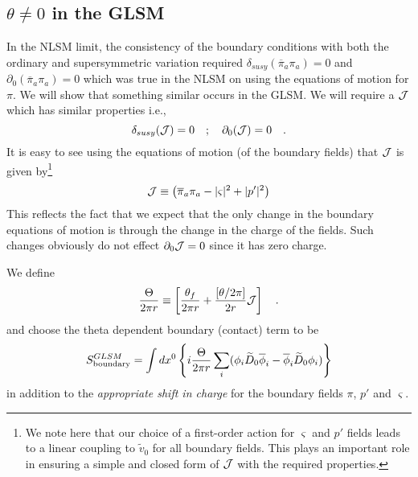 \documentclass[a4paper,12pt]{article}
\begin{document}
\subsection{$\theta\neq0$ in the GLSM}

In the NLSM limit, the consistency of the boundary conditions with both
the ordinary and supersymmetric variation required
$\delta_{susy}(\overline{\pi}_a\pi_a)=0$ and
$\partial_0(\overline{\pi}_a\pi_a)=0$ which was true in the NLSM on using
the equations of motion for $\pi$. We
will show that something similar occurs in the GLSM. We will
require a ${\cal J}$ which has similar properties i.e.,
$$
\delta_{susy}({\cal J})=0\quad;\quad \partial_0 ({\cal J})=0
\label{curlyJ} \quad.
$$
It is easy to see using the equations of motion (of the boundary fields)
that ${\cal J}$ is  given by\footnote{We note here that our 
choice of a first-order action for $\varsigma$ and $p'$ fields leads to 
a linear coupling to $\widetilde{v}_0$ for all boundary fields. This plays
an important role in ensuring a simple and closed form of ${\cal J}$ with
the required properties.}
\begin{equation}
{\cal J} \equiv \left (\overline{\pi}_a \pi_a - |\varsigma|^2 + |p'|^2
\right)
\end{equation}
This reflects the fact that we expect that the only change in
the boundary equations  of motion is through the change in the 
charge of the fields. Such changes obviously do not effect $\partial_0
{\cal J} =0$ since it has zero charge.

We define 
$$
{\Theta\over{2\pi r}}\equiv \left[{{\theta_f}\over{2\pi r}} 
+{{[\theta/2\pi]}\over{2 r}} {\cal J}\right]\quad.
$$
and choose the theta dependent boundary (contact) term to be
\begin{equation}
S^{GLSM}_{\rm boundary}= \int dx^0\left\{  i{\Theta\over{2\pi r}}
\sum_i (\phi_i \widetilde{D}_0\overline{\phi}_i - \overline{\phi}_i
\widetilde{D}_0 \phi_i)
\right\}
\end{equation}
in addition to the {\em appropriate shift in charge} for the boundary fields
$\pi$, $p'$ and $\varsigma$.
\end{document}
